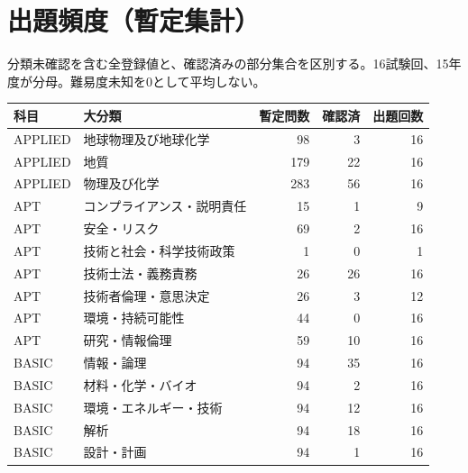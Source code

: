 \chapter{出題頻度（暫定集計）}
分類未確認を含む全登録値と、確認済みの部分集合を区別する。16試験回、15年度が分母。難易度未知を0として平均しない。
\begin{longtable}{p{.16\linewidth}p{.42\linewidth}rrr}
科目 & 大分類 & 暫定問数 & 確認済 & 出題回数\\\hline
APPLIED & 地球物理及び地球化学 & 98 & 3 & 16\\
APPLIED & 地質 & 179 & 22 & 16\\
APPLIED & 物理及び化学 & 283 & 56 & 16\\
APT & コンプライアンス・説明責任 & 15 & 1 & 9\\
APT & 安全・リスク & 69 & 2 & 16\\
APT & 技術と社会・科学技術政策 & 1 & 0 & 1\\
APT & 技術士法・義務責務 & 26 & 26 & 16\\
APT & 技術者倫理・意思決定 & 26 & 3 & 12\\
APT & 環境・持続可能性 & 44 & 0 & 16\\
APT & 研究・情報倫理 & 59 & 10 & 16\\
BASIC & 情報・論理 & 94 & 35 & 16\\
BASIC & 材料・化学・バイオ & 94 & 2 & 16\\
BASIC & 環境・エネルギー・技術 & 94 & 12 & 16\\
BASIC & 解析 & 94 & 18 & 16\\
BASIC & 設計・計画 & 94 & 1 & 16\\
\end{longtable}
